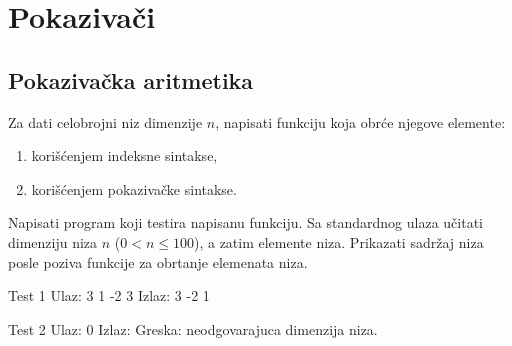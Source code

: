 \chapter{Pokazivači}

\section{Pokazivačka aritmetika}

\begin{Exercise}[label=301]
Za dati celobrojni niz dimenzije $n$, napisati funkciju koja obrće njegove elemente:
\begin{enumerate}
\item korišćenjem indeksne sintakse,
\item korišćenjem pokazivačke sintakse.
\end{enumerate}
Napisati program koji testira napisanu funkciju. Sa standardnog ulaza učitati dimenziju 
niza $n$ ($0 < n \leq 100$), a zatim elemente niza. Prikazati sadržaj niza posle 
poziva funkcije za obrtanje elemenata niza. 

\begin{minitest}
\begin{test}{Test 1}
Ulaz:  3
       1 -2 3
Izlaz: 3 -2 1 
\end{test}
\end{minitest}
\begin{maxitest}
\begin{test}{Test 2}
Ulaz:  0
Izlaz: Greska: neodgovarajuca dimenzija niza.
\end{test}
\end{maxitest}

\end{Exercise}
\begin{Answer}[ref=301]
\end{Answer}

